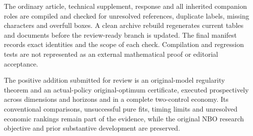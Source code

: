 \documentclass[ecta,nameyear,draft]{econsocart}
\begin{document}
The ordinary article, technical supplement, response and all inherited
companion roles are compiled and checked for unresolved references,
duplicate labels, missing characters and overfull boxes. A clean archive
rebuild regenerates current tables and documents before the review-ready
branch is updated. The final manifest records exact identities and the
scope of each check. Compilation and regression tests are not
represented as an external mathematical proof or editorial acceptance.

The positive addition submitted for review is an original-model
regularity theorem and an actual-policy original-optimum certificate,
executed prospectively across dimensions and horizons and in a complete
two-control economy. Its conventional comparisons, unsuccessful pure
fits, timing limits and unresolved economic rankings remain part of the
evidence, while the original NBO research objective and prior
substantive development are preserved.
\end{document}

